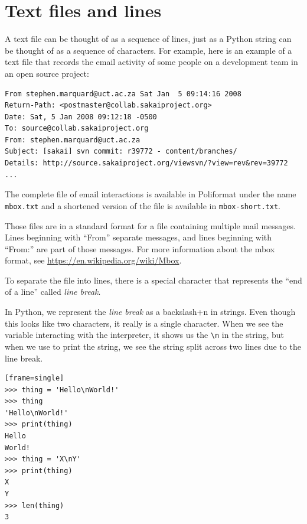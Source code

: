 \hypertarget{ficheros-de-texto-y-luxedneas}{%
\section{Text files and lines}\label{ficheros-de-texto-y-luxedneas}}

A text file can be thought of as a sequence of lines, just as a Python string can be thought of as a sequence of characters. For example, here is an example of a text file that records the email activity of some people on a development team in an open source project:

\begin{Verbatim}[frame=single]
From stephen.marquard@uct.ac.za Sat Jan  5 09:14:16 2008
Return-Path: <postmaster@collab.sakaiproject.org>
Date: Sat, 5 Jan 2008 09:12:18 -0500
To: source@collab.sakaiproject.org
From: stephen.marquard@uct.ac.za
Subject: [sakai] svn commit: r39772 - content/branches/
Details: http://source.sakaiproject.org/viewsvn/?view=rev&rev=39772
...
\end{Verbatim}

The complete file of email interactions is available in Poliformat under the name \texttt{mbox.txt} and a shortened version of the file is available in \texttt{mbox-short.txt}.

Those files are in a standard format for a file containing multiple mail messages. Lines beginning with ``From'' separate messages, and lines beginning with ``From:'' are part of those messages. For more information about the mbox format, see \url{https://en.wikipedia.org/wiki/Mbox}.

To separate the file into lines, there is a special character that represents the ``end of a line'' called \emph{line break}.


In Python, we represent the \emph{line break} as a backslash+n in strings. Even though this looks like two characters, it really is a single character. When we see the variable interacting with the interpreter, it shows us the \verb|\n| in the string, but when we use  to print the string, we see the string split across two lines due to the line break.

\begin{Verbatim}[frame=single][frame=single]
>>> thing = 'Hello\nWorld!'
>>> thing
'Hello\nWorld!'
>>> print(thing)
Hello
World!
>>> thing = 'X\nY'
>>> print(thing)
X
Y
>>> len(thing)
3
\end{Verbatim}


